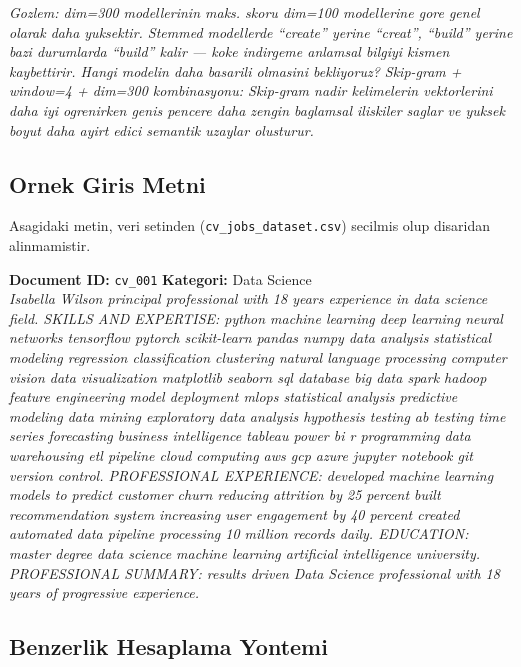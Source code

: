 \documentclass[12pt, a4paper]{article}
\begin{document}
\textit{Gozlem: dim=300 modellerinin maks. skoru dim=100 modellerine gore genel olarak daha yuksektir. Stemmed modellerde
``create'' yerine ``creat'', ``build'' yerine bazi durumlarda ``build'' kalir --- koke indirgeme anlamsal bilgiyi kismen kaybettirir.
Hangi modelin daha basarili olmasini bekliyoruz? Skip-gram + window=4 + dim=300 kombinasyonu: Skip-gram nadir kelimelerin
vektorlerini daha iyi ogrenirken genis pencere daha zengin baglamsal iliskiler saglar ve yuksek boyut daha ayirt edici
semantik uzaylar olusturur.}


\subsection{Ornek Giris Metni}

Asagidaki metin, veri setinden (\texttt{cv\_jobs\_dataset.csv}) secilmis olup disaridan alinmamistir.

\begin{mdframed}[style=bilgi]
\textbf{Document ID:} \texttt{cv\_001} \quad \textbf{Kategori:} Data Science\\[0.3cm]
\textit{Isabella Wilson principal professional with 18 years experience in data science field.
SKILLS AND EXPERTISE: python machine learning deep learning neural networks tensorflow pytorch
scikit-learn pandas numpy data analysis statistical modeling regression classification clustering
natural language processing computer vision data visualization matplotlib seaborn sql database
big data spark hadoop feature engineering model deployment mlops statistical analysis predictive
modeling data mining exploratory data analysis hypothesis testing ab testing time series forecasting
business intelligence tableau power bi r programming data warehousing etl pipeline cloud computing
aws gcp azure jupyter notebook git version control. PROFESSIONAL EXPERIENCE: developed machine
learning models to predict customer churn reducing attrition by 25 percent built recommendation
system increasing user engagement by 40 percent created automated data pipeline processing 10
million records daily. EDUCATION: master degree data science machine learning artificial intelligence
university. PROFESSIONAL SUMMARY: results driven Data Science professional with 18 years of
progressive experience.}
\end{mdframed}

\subsection{Benzerlik Hesaplama Yontemi}
\end{document}
